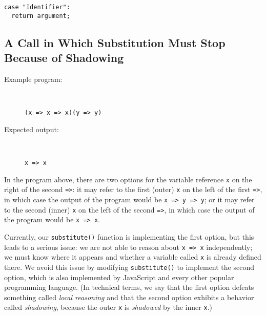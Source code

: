 \documentclass[12pt, oneside]{book}
\begin{document}
\begin{verbatim}
case "Identifier":
  return argument;
\end{verbatim}

\subsection{A Call in Which Substitution Must Stop Because of Shadowing}

\begin{description}
\item [Example program:] ~

\begin{verbatim}
(x => x => x)(y => y)
\end{verbatim}

\item [Expected output:] ~

\begin{verbatim}
x => x
\end{verbatim}
\end{description}

In the program above, there are two options for the variable reference \texttt{x} on the right of the second \texttt{=>}: it may refer to the first (outer) \texttt{x} on the left of the first \texttt{=>}, in which case the output of the program would be \texttt{x => y => y}; or it may refer to the second (inner) \texttt{x} on the left of the second \texttt{=>}, in which case the output of the program would be \texttt{x => x}.

Currently, our \texttt{substitute()} function is implementing the first option, but this leads to a serious issue: we are not able to reason about \texttt{x => x} independently; we must know where it appears and whether a variable called \texttt{x} is already defined there. We avoid this issue by modifying \texttt{substitute()} to implement the second option, which is also implemented by JavaScript and every other popular programming language. (In technical terms, we say that the first option defeats something called \emph{local reasoning} and that the second option exhibits a behavior called \emph{shadowing}, because the outer \texttt{x} is \emph{shadowed} by the inner \texttt{x}.)


\appendix
\end{document}
